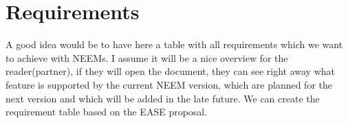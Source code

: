 \chapter{Requirements}
A good idea would be to have here a table with all requirements which we want to achieve with NEEMs.
I assume it will be a nice overview for the reader(partner), if they will open the document, they can see right away what feature is supported by the current NEEM version, which are planned for the next version and which will be added in the late future. We can create the requirement table based on the EASE proposal.